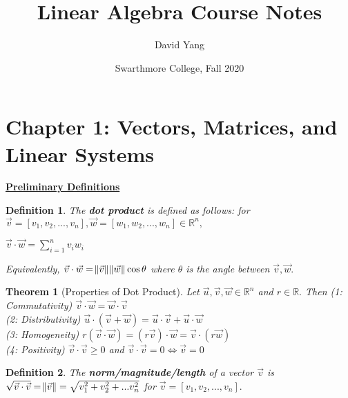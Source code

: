 \documentclass{article}
\title{Linear Algebra Course Notes}
\author{David Yang}
\date{Swarthmore College, Fall 2020}
\begin{document}
\newtheorem{definition}{Definition}[section]
\newtheorem{theorem}{Theorem}[section]
\newtheorem{corollary}{Corollary}[theorem]
\newtheorem{lemma}[theorem]{Lemma}

\setlength{\parindent}{0pt}

    \maketitle
    \section{Chapter 1: Vectors, Matrices, and Linear Systems}
    
    \textbf{\underline{Preliminary Definitions}}


    \begin{definition} 
    
    The \textbf{dot product} is defined as follows: for $\vec{v} = [v_1, v_2, ..., v_n], \vec{w} = [w_1, w_2, ... , w_n] \in \mathbb{R}^n, $ \\
    
    \centerline{$\vec{v} \cdot \vec{w} = \sum\limits_{i=1}^n v_iw_i$} 

    Equivalently, $\vec{v} \cdot \vec{w} = \norm{\vec{v}} \norm{\vec{w}} \cos{\theta}$ where $\theta$ is the angle between $\vec{v}, \vec{w}.$
    \end{definition}
    
    
    \begin{theorem}[Properties of Dot Product]
    Let $\vec{u}, \vec{v}, \vec{w} \in \mathbb{R}^n$ and $r \in \mathbb{R}.$ Then 
    (1: Commutativity) $\vec{v} \cdot \vec{w} = \vec{w} \cdot \vec{v}$\\
    (2: Distributivity) $\vec{u} \cdot (\vec{v} + \vec{w}) = \vec{u} \cdot \vec{v} + \vec{u} \cdot \vec{w}$\\
    (3: Homogeneity) $r(\vec{v} \cdot \vec{w}) = (r\vec{v}) \cdot \vec{w} = \vec{v} \cdot (r\vec{w})$\\
    (4: Positivity) $\vec{v} \cdot \vec{v} \geq 0$ and $\vec{v} \cdot \vec{v} = 0 \iff \vec{v} = 0$
    \end{theorem}
    
    \begin{definition}
    The \textbf{norm/magnitude/length} of a vector $\vec{v}$ is $\sqrt{\vec{v} \cdot \vec{v}} = \norm{\vec{v}} = \sqrt{v_1^2 + v_2^2 + ... v_n^2} $ for $\vec{v} = [v_1, v_2, ... , v_n].$ \\ \\
    \end{definition}    
\end{document}
